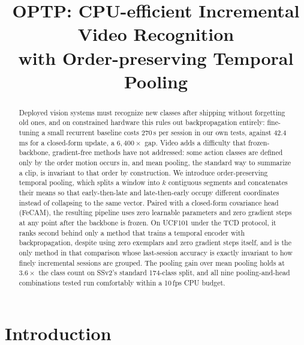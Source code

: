 \documentclass[11pt]{article}
\title{OPTP: CPU-efficient Incremental Video Recognition\\ with Order-preserving Temporal Pooling}
\author{}
\date{}
\begin{document}
\maketitle

\begin{abstract}
Deployed vision systems must recognize new classes after shipping without
forgetting old ones, and on constrained hardware this rules out
backpropagation entirely: fine-tuning a small recurrent baseline costs
270\,s per session in our own tests, against 42.4\,ms for a closed-form
update, a $6{,}400\times$ gap. Video adds a difficulty that
frozen-backbone, gradient-free methods have not addressed: some action
classes are defined only by the order motion occurs in, and mean pooling,
the standard way to summarize a clip, is invariant to that order by
construction. We introduce order-preserving temporal pooling, which splits
a window into $k$ contiguous segments and concatenates their means so that
early-then-late and late-then-early occupy different coordinates instead
of collapsing to the same vector. Paired with a closed-form covariance
head (FeCAM), the resulting pipeline uses zero learnable parameters and
zero gradient steps at any point after the backbone is frozen. On UCF101
under the TCD protocol, it ranks second behind only a method that trains a
temporal encoder with backpropagation, despite using zero exemplars and
zero gradient steps itself, and is the only method in that comparison
whose last-session accuracy is exactly invariant to how finely incremental
sessions are grouped. The pooling gain over mean pooling holds at $3.6\times$ the class
count on SSv2's standard 174-class split, and all nine pooling-and-head
combinations tested run comfortably within a 10\,fps CPU budget.
\end{abstract}

\section{Introduction}
\label{sec:intro}
\end{document}
